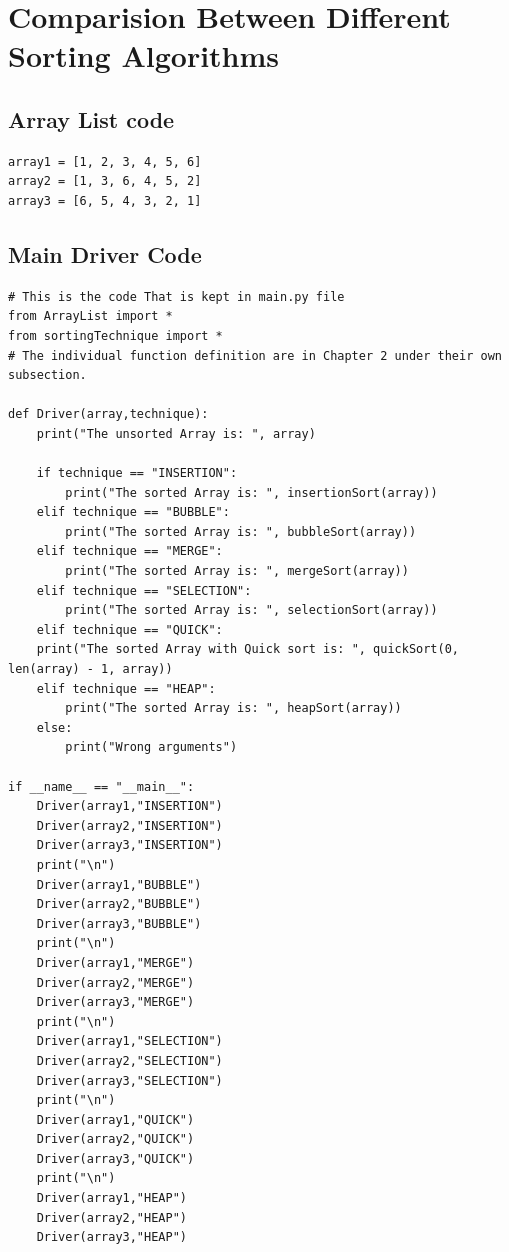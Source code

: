 \documentclass{article}
\begin{document}
\clearpage
\section{Comparision Between Different Sorting Algorithms}
\subsection{Array List code}
\begin{verbatim}
array1 = [1, 2, 3, 4, 5, 6]
array2 = [1, 3, 6, 4, 5, 2]
array3 = [6, 5, 4, 3, 2, 1]
\end{verbatim}
\subsection{Main Driver Code}
\begin{verbatim}
# This is the code That is kept in main.py file
from ArrayList import *
from sortingTechnique import *
# The individual function definition are in Chapter 2 under their own subsection.

def Driver(array,technique):
    print("The unsorted Array is: ", array)

    if technique == "INSERTION":
        print("The sorted Array is: ", insertionSort(array))
    elif technique == "BUBBLE":
        print("The sorted Array is: ", bubbleSort(array))
    elif technique == "MERGE":
        print("The sorted Array is: ", mergeSort(array))
    elif technique == "SELECTION":
        print("The sorted Array is: ", selectionSort(array))
    elif technique == "QUICK":
    print("The sorted Array with Quick sort is: ", quickSort(0, len(array) - 1, array))
    elif technique == "HEAP":
        print("The sorted Array is: ", heapSort(array))
    else:
        print("Wrong arguments")

if __name__ == "__main__":
    Driver(array1,"INSERTION")
    Driver(array2,"INSERTION")
    Driver(array3,"INSERTION")
    print("\n")
    Driver(array1,"BUBBLE")
    Driver(array2,"BUBBLE")
    Driver(array3,"BUBBLE")
    print("\n")
    Driver(array1,"MERGE")
    Driver(array2,"MERGE")
    Driver(array3,"MERGE")
    print("\n")
    Driver(array1,"SELECTION")
    Driver(array2,"SELECTION")
    Driver(array3,"SELECTION")
    print("\n")
    Driver(array1,"QUICK")
    Driver(array2,"QUICK")
    Driver(array3,"QUICK")
    print("\n")
    Driver(array1,"HEAP")
    Driver(array2,"HEAP")
    Driver(array3,"HEAP")
\end{verbatim}
\end{document}
